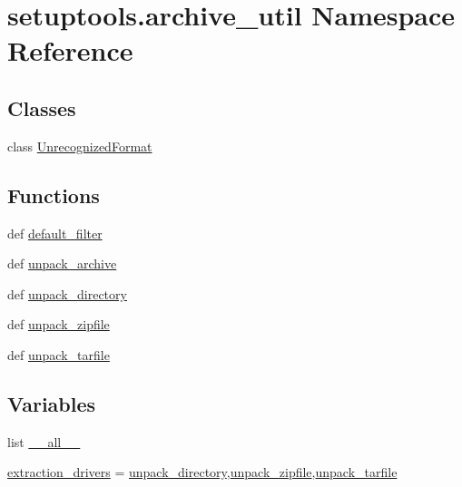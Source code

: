 \hypertarget{namespacesetuptools_1_1archive__util}{}\section{setuptools.\+archive\+\_\+util Namespace Reference}
\label{namespacesetuptools_1_1archive__util}
\subsection*{Classes}
\begin{DoxyCompactItemize}
\item 
class \hyperlink{classsetuptools_1_1archive__util_1_1UnrecognizedFormat}{Unrecognized\+Format}
\end{DoxyCompactItemize}
\subsection*{Functions}
\begin{DoxyCompactItemize}
\item 
def \hyperlink{namespacesetuptools_1_1archive__util_a83a8fde113dc880b3f00610c4cf109a1}{default\+\_\+filter}
\item 
def \hyperlink{namespacesetuptools_1_1archive__util_aff3b0ef1a7cb2d5dc48e0e0f0bd03a6d}{unpack\+\_\+archive}
\item 
def \hyperlink{namespacesetuptools_1_1archive__util_ad679f1ee39a4129603d2639574f61574}{unpack\+\_\+directory}
\item 
def \hyperlink{namespacesetuptools_1_1archive__util_a03ae2f1f70db6d27fbf820e3236be043}{unpack\+\_\+zipfile}
\item 
def \hyperlink{namespacesetuptools_1_1archive__util_a8b540f90551a626bb4f5703cbf9d69d0}{unpack\+\_\+tarfile}
\end{DoxyCompactItemize}
\subsection*{Variables}
\begin{DoxyCompactItemize}
\item 
list \hyperlink{namespacesetuptools_1_1archive__util_a665706844108894c054ee5eba5e6e0bb}{\+\_\+\+\_\+all\+\_\+\+\_\+}
\item 
\hyperlink{namespacesetuptools_1_1archive__util_a2648d1e9cc1b921fec949efb97c64295}{extraction\+\_\+drivers} = \hyperlink{namespacesetuptools_1_1archive__util_ad679f1ee39a4129603d2639574f61574}{unpack\+\_\+directory},\hyperlink{namespacesetuptools_1_1archive__util_a03ae2f1f70db6d27fbf820e3236be043}{unpack\+\_\+zipfile},\hyperlink{namespacesetuptools_1_1archive__util_a8b540f90551a626bb4f5703cbf9d69d0}{unpack\+\_\+tarfile}
\end{DoxyCompactItemize}


